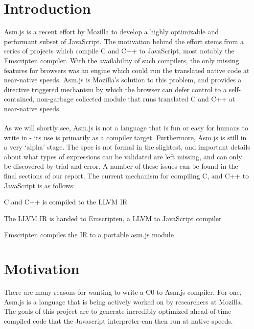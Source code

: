 \documentclass[twoside]{article}
\begin{document}
\begin{multicols}{2} %

\section{Introduction}


Asm.js is a recent effort by Mozilla to develop a highly optimizable and performant
subset of JavaScript. The motivation behind the effort stems from a series of projects which
compile C and C++ to JavaScript, most notably the Emscripten compiler. With the availability of such
compilers, the only missing features for browsers was an engine which could run the
translated native code at near-native speeds. Asm.js is Mozilla's solution to this problem,
and provides a directive triggered mechanism by which the browser can defer control to a
self-contained, non-garbage collected module that runs translated C and C++ at near-native speeds. \\
\\
As we will shortly see, Asm.js is not a language that is fun or easy for humans to write in -
its use is primarily as a compiler target. Furthermore, Asm.js is still in a very `alpha' stage. 
The spec is not formal in the slightest, and important details about what types of expressions can
be validated are left missing, and can only be discovered by trial and error. A number of these issues
can be found in the final sections of our report. The current mechanism for compiling C, and C++ to
JavaScript is as follows:

\begin{compactitem}
  \item C and C++ is compiled to the LLVM IR
  \item The LLVM IR is handed to Emscripten, a LLVM to JavaScript compiler
  \item Emscripten compiles the IR to a portable asm.js module
\end{compactitem}

\section{Motivation}

There are many reasons for wanting to write a C0 to Asm.js compiler. For one,
Asm.js is a language that is being actively worked on by researchers at Mozilla.
The goals of this project are to generate incredibly optimized ahead-of-time 
compiled code that the Javascript interpreter can then run at native speeds.


\end{multicols}
\end{document}
